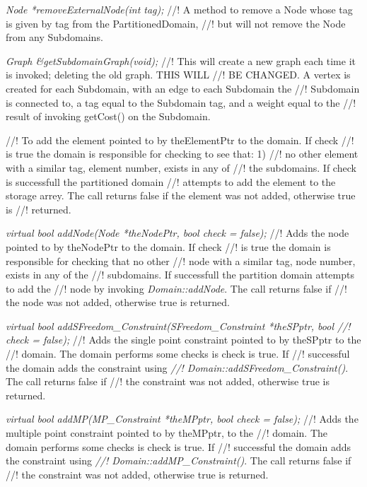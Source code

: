 {\em Node *removeExternalNode(int tag); }
//! A method to remove a Node whose tag is given by \p tag from the PartitionedDomain, 
//! but will not remove the Node from any Subdomains.

{\em Graph \&getSubdomainGraph(void); }
//! This will create a new graph each time it is invoked; deleting the old graph. THIS WILL
//! BE CHANGED.  A vertex is created for each Subdomain, with an edge to each Subdomain the 
//! Subdomain is connected to, a tag equal to the Subdomain tag,  and a weight equal to the 
//! result of invoking getCost() on the Subdomain.

//! To add the element pointed to by theElementPtr to the domain. If \p check
//! is \p true the domain is responsible for checking to see that: 1)
//! no other element with a similar tag, element number, exists in any of
//! the subdomains. If check is successfull the partitioned domain
//! attempts to add the element to the storage arrey. The call returns
\p false if the element was not added, otherwise \p true is 
//! returned.   

{\em virtual bool addNode(Node *theNodePtr, bool check = false);}
//! Adds the node pointed to by theNodePtr to the domain. If \p check
//! is \p true the domain is responsible for checking that no other
//! node with a similar tag, node number, exists in any of the
//! subdomains. If successfull the partition domain attempts to add the
//! node by invoking {\em Domain::addNode}. The call returns \p false if
//! the node was not added, otherwise \p true is returned.  


{\em virtual bool addSFreedom\_Constraint(SFreedom\_Constraint *theSPptr, bool
//! check = false);}
//! Adds the single point constraint pointed to by theSPptr to the 
//! domain. The domain performs some checks is \p check is true. If
//! successful the domain adds the constraint using {\em
//! Domain::addSFreedom\_Constraint()}. The call returns \p false if
//! the constraint was not added, otherwise \p true is returned.  

{\em virtual bool addMP(MP\_Constraint *theMPptr, bool check = false);}
//! Adds the multiple point constraint pointed to by theMPptr, to the
//! domain. The domain performs some checks is \p check is true. If
//! successful the domain adds the constraint using {\em
//! Domain::addMP\_Constraint()}. The call returns \p false if
//! the constraint was not added, otherwise \p true is returned.  


